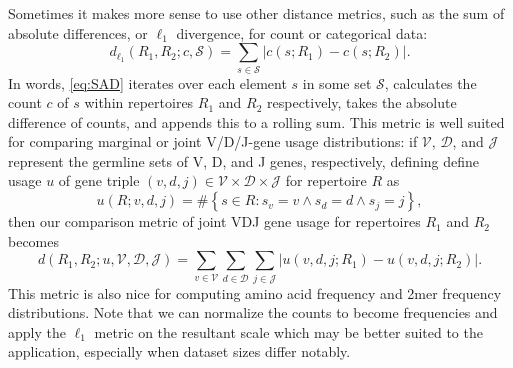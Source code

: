 \documentclass{article}
\begin{document}
Sometimes it makes more sense to use other distance metrics, such as the sum of absolute differences, or $\ell_1$ divergence, for count or categorical data:
\begin{equation}\label{eq:SAD}
    d_{\ell_1}(R_1, R_2; c, \mathcal S) = \sum_{s \in \mathcal S} \left| c(s; R_1) - c(s; R_2) \right|.
\end{equation}
In words, \eqref{eq:SAD} iterates over each element $s$ in some set $\mathcal S$, calculates the count $c$ of $s$ within repertoires $R_1$ and $R_2$ respectively, takes the absolute difference of counts, and appends this to a rolling sum.
This metric is well suited for comparing marginal or joint V/D/J-gene usage distributions:
if $\mathcal V$, $\mathcal D$, and $\mathcal J$ represent the germline sets of V, D, and J genes, respectively,
defining define usage $u$ of gene triple $(v, d, j) \in \mathcal V \times \mathcal D \times \mathcal J$ for repertoire $R$ as
\begin{equation}
u(R; v, d, j) = \#\left\{s \in R: s_v = v \land s_d = d \land s_j = j\right\},
\end{equation}
then our comparison metric of joint VDJ gene usage for repertoires $R_1$ and $R_2$ becomes
\begin{equation}
d(R_1, R_2; u, \mathcal V, \mathcal D, \mathcal J) = \sum_{v \in \mathcal V} \sum_{d \in \mathcal D} \sum_{j \in \mathcal J} \left| u(v, d, j; R_1) - u(v, d, j; R_2) \right|.
\end{equation}
This metric is also nice for computing amino acid frequency and 2mer frequency distributions.
Note that we can normalize the counts to become frequencies and apply the $\ell_1$ metric on the resultant scale which may be better suited to the application, especially when dataset sizes differ notably.
\end{document}
